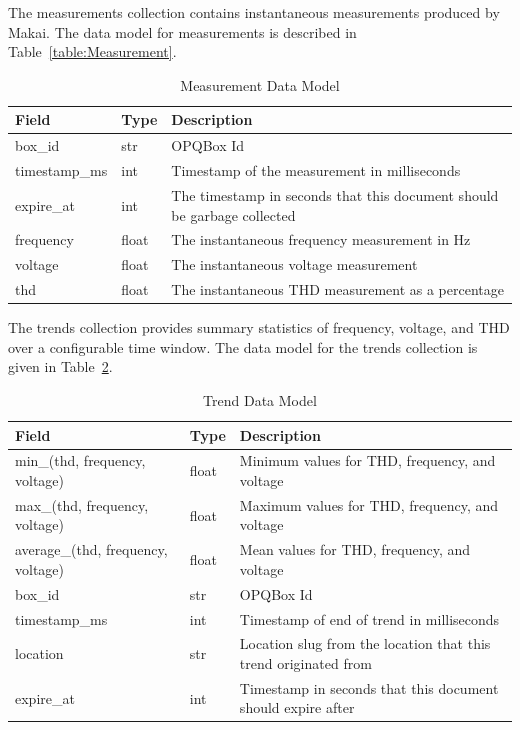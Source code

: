 The measurements collection contains instantaneous measurements produced by Makai. The data model for measurements is described in Table~\ref{table:Measurement}.

\begin{table}[H]
	\centering
	\caption{Measurement Data Model}
	\begin{tabularx}{\textwidth}{llX}
		\toprule
		\textbf{Field} & \textbf{Type} & \textbf{Description} \\
		\midrule
		box\_id & str & OPQBox Id \\
		timestamp\_ms & int & Timestamp of the measurement in milliseconds \\
		expire\_at & int & The timestamp in seconds that this document should be garbage collected \\
		frequency & float & The instantaneous frequency measurement in Hz \\
		voltage & float & The instantaneous voltage measurement \\
		thd & float & The instantaneous THD measurement as a percentage \\
		\bottomrule
	\end{tabularx}
	\label{table:Measurements}
\end{table}

The trends collection provides summary statistics of frequency, voltage, and THD over a configurable time window. The data model for the trends collection is given in Table~\ref{table:Trends}.

\begin{table}[H]
	\centering
	\caption{Trend Data Model}
	\begin{tabularx}{\textwidth}{XlX}
		\toprule
		\textbf{Field} & \textbf{Type} & \textbf{Description} \\
		\midrule
		min\_(thd, frequency, voltage) & float & Minimum values for THD, frequency, and voltage \\
		max\_(thd, frequency, voltage) & float & Maximum values for THD, frequency, and voltage \\
		average\_(thd, frequency, voltage) & float & Mean values for THD, frequency, and voltage \\
		box\_id & str & OPQBox Id \\
		timestamp\_ms & int & Timestamp of end of trend in milliseconds \\
		location & str & Location slug from the location that this trend originated from \\
		expire\_at & int & Timestamp in seconds that this document should expire after \\
		\bottomrule
	\end{tabularx}
	\label{table:Trends}
\end{table}

